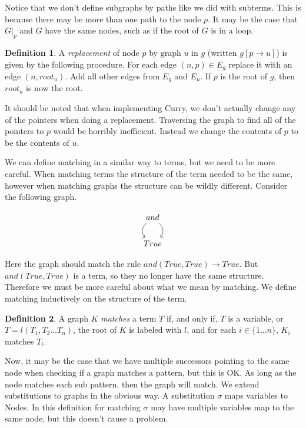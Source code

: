 \documentclass{book}
\theoremstyle{definition}
\newtheorem{definition}{Definition}[section]
\begin{document}
Notice that we don't define subgraphs by paths like we did with subterms.
This is because there may be more than one path to the node $p$.
It may be the case that $G\vert_p$ and $G$ have the same nodes, such as if the root of $G$ is in a loop.

\theoremstyle{definition}
\begin{definition}
A \emph{replacement} of node $p$ by graph $u$ in $g$ 
(written $g[p \to u]$) is given by the following procedure.
For each edge $(n,p) \in E_g$ replace it with an edge $(n, root_u)$.
Add all other edges from $E_g$ and $E_u$.
If $p$ is the root of $g$, then $root_u$ is now the root.
\end{definition}

It should be noted that when implementing Curry, we don't actually change
any of the pointers when doing a replacement.
Traversing the graph to find all of the pointers to $p$ would be horribly inefficient.
Instead we change the contents of $p$ to be the contents of $u$.

We can define matching in a similar way to terms, but we need to be more careful.
When matching terms the structure of the term needed to be the same,
however when matching graphs the structure can be wildly different.
Consider the following graph.

$$
\begin{tikzcd}
    and \ar[d, bend right=50] \ar[d, bend left=50] \\
    True
\end{tikzcd}
$$

Here the graph should match the rule $and(True,True) \rightarrow True$.
But $and(True,True)$ is a term, so they no longer have the same structure.
Therefore we must be more careful about what we mean by matching.
We define matching inductively on the structure of the term.


\theoremstyle{definition}
\begin{definition}
A graph $K$ \emph{matches} a term $T$ if, and only if,
$T$ is a variable,
or $T = l(T_1,T_2\ldots T_n)$, the root of $K$ is labeled with $l$,
and for each $i \in \{1\ldots n\}$, $K_i$ matches $T_i$.
\end{definition}

Now, it may be the case that we have multiple successors pointing to the same node
when checking if a graph matches a pattern, but this is OK.
As long as the node matches each sub pattern, then the graph will match.
We extend substitutions to graphs in the obvious way.
A substitution $\sigma$ maps variables to Nodes.
In this definition for matching $\sigma$ may have multiple variables map to the same node,
but this doesn't cause a problem.
\end{document}
